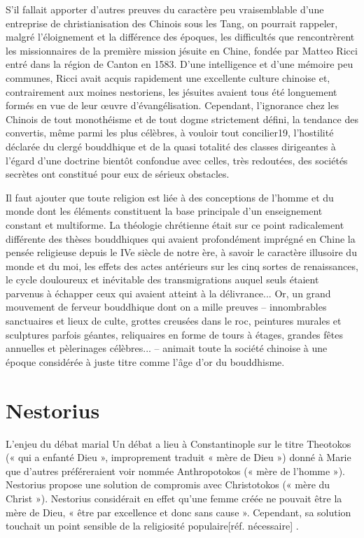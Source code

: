 S'il fallait apporter d'autres preuves du caractère peu vraisemblable
d'une entreprise de christianisation des Chinois sous les Tang, on
pourrait rappeler, malgré l'éloignement et la différence des époques,
les difficultés que rencontrèrent les missionnaires de
la première mission jésuite en Chine, fondée par Matteo Ricci entré dans
la région de Canton en 1583. D'une intelligence et d'une mémoire peu
communes, Ricci avait acquis rapidement une excellente culture chinoise
et, contrairement aux moines nestoriens, les jésuites avaient tous été
longuement formés en vue de leur œuvre d'évangélisation. Cependant,
l'ignorance chez les Chinois de tout monothéisme et de tout dogme
strictement défini, la tendance des convertis, même parmi les plus
célèbres, à vouloir tout concilier19, l'hostilité déclarée du clergé
bouddhique et de la quasi totalité des classes dirigeantes à l'égard
d'une doctrine bientôt confondue avec celles, très redoutées, des
sociétés secrètes ont constitué pour eux de sérieux obstacles.

Il faut ajouter que toute religion est liée à des conceptions de
l'homme et du monde dont les éléments constituent la base principale
d'un enseignement constant et multiforme. La théologie chrétienne était
sur ce point radicalement différente des thèses bouddhiques qui avaient
profondément imprégné en Chine la pensée religieuse depuis le IVe siècle
de notre ère, à savoir le caractère illusoire du monde et du moi, les
effets des actes antérieurs sur les cinq sortes de renaissances, le
cycle douloureux et inévitable des transmigrations auquel seuls étaient
parvenus à échapper ceux qui avaient atteint à la délivrance... Or, un
grand mouvement de ferveur bouddhique dont on a mille preuves --
innombrables sanctuaires et lieux de culte, grottes creusées dans le
roc, peintures murales et sculptures parfois géantes, reliquaires en
forme de tours à étages, grandes fêtes annuelles et pèlerinages
célèbres... -- animait toute la société chinoise à une époque considérée à juste titre comme l'âge d'or du bouddhisme.


\section{Nestorius}

L'enjeu du débat marial
Un débat a lieu à Constantinople sur le titre Theotokos (« qui a enfanté Dieu », improprement traduit « mère de Dieu ») donné à Marie que d'autres préféreraient voir nommée Anthropotokos (« mère de l'homme »). Nestorius propose une solution de compromis avec Christotokos (« mère du Christ »). Nestorius considérait en effet qu'une femme créée ne pouvait être la mère de Dieu, « être par excellence et donc sans cause ». Cependant, sa solution touchait un point sensible de la religiosité populaire[réf. nécessaire] .

